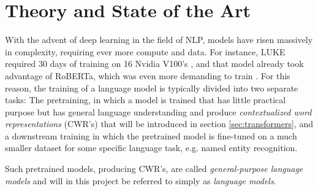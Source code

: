 \documentclass[main.tex]{subfiles}
\begin{document}
\chapter{Theory and State of the Art}
\label{chap:theory}
With the advent of deep learning in the field of NLP, models have risen massively in complexity, requiring ever more compute and data.
For instance, LUKE required 30 days of training on 16 Nvidia V100's \cite{yamada2020luke}, and that model already took advantage of RoBERTa, which was even more demanding to train \cite{liu2019roberta}.
For this reason, the training of a language model is typically divided into two separate tasks:
The pretraining, in which a model is trained that has little practical purpose but has general language understanding and produce \emph{contextualized word representations} (CWR's) that will be introduced in section \ref{sec:transformers}, and a downstream training in which the pretrained model is fine-tuned on a much smaller dataset for some specific language task, e.g. named entity recognition.

Such pretrained models, producing CWR's, are called \emph{general-purpose language models} \cite[Ch. 2]{birk2020knowledge} and will in this project be referred to simply as \emph{language models}.
\end{document}
